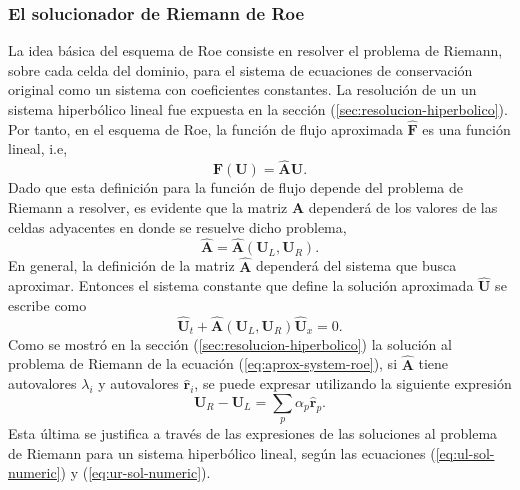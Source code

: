 \subsubsection{El solucionador de Riemann de Roe}
La idea básica del esquema de Roe consiste en resolver el problema de Riemann, sobre cada celda del dominio, para el sistema de ecuaciones de conservación original como un sistema con coeficientes constantes. La resolución de un un sistema hiperbólico lineal fue expuesta en la sección (\ref{sec:resolucion-hiperbolico}). Por tanto, en el esquema de Roe, la función de flujo aproximada $\mathbf{\hat{F}}$ es una función lineal, i.e, 
\begin{equation}
	\mathbf{\hat{F}}(\mathbf{U}) = \mathbf{\hat{A}}\mathbf{U}.
\end{equation}
Dado que esta definición para la función de flujo depende del problema de Riemann a resolver, es evidente que la matriz $\mathbf{\hat{A}}$ dependerá de los valores de las celdas adyacentes en donde se resuelve dicho problema,
\begin{equation}
	\mathbf{\hat{A}} = \mathbf{\hat{A}}(\mathbf{U}_L, \mathbf{U}_R).
\end{equation}
En general, la definición de la matriz $\mathbf{\hat{A}}$ dependerá del sistema que busca aproximar. Entonces el sistema constante que define la solución aproximada $\mathbf{\hat{U}}$ se escribe como
\begin{equation}
	\mathbf{\hat{U}}_t + \mathbf{\hat{A}}(\mathbf{U}_L, \mathbf{U}_R)\mathbf{\hat{U}}_x = 0.
	\label{eq:aprox-system-roe}
\end{equation}
Como se mostró en la sección (\ref{sec:resolucion-hiperbolico}) la solución al problema de Riemann de la ecuación (\ref{eq:aprox-system-roe}), si $\mathbf{\hat{A}}$ tiene autovalores $\lambda_i$ y autovalores $\mathbf{\hat{r}}_{i}$, se puede expresar utilizando la siguiente expresión
\begin{equation}
	\mathbf{U}_R - \mathbf{U}_L = \sum_{p} {\alpha}_p \mathbf{\hat{r}}_{p}.
\end{equation}
Esta última se justifica a través de las expresiones de las soluciones al problema de Riemann para un sistema hiperbólico lineal, según las ecuaciones (\ref{eq:ul-sol-numeric}) y (\ref{eq:ur-sol-numeric}).
